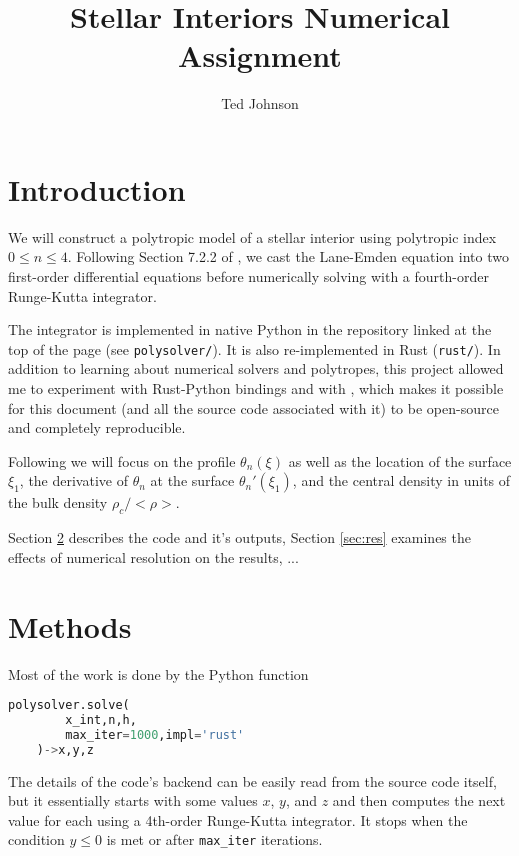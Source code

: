 \documentclass[twocolumn]{aastex631}
\begin{document}
\title{Stellar Interiors Numerical Assignment}

\author{Ted Johnson}


\section{Introduction}
\label{sec:intro}

We will construct a polytropic model of a stellar interior using
polytropic index $0\le n \le 4$. Following Section 7.2.2 of
\citet{textbook}, we cast the Lane-Emden equation into two
first-order differential equations before numerically solving
with a fourth-order Runge-Kutta integrator.

The integrator is implemented in native Python in the repository
linked at the top of the page (see \texttt{polysolver/}). It is
also re-implemented in Rust (\texttt{rust/}). In addition to
learning about numerical solvers and polytropes, this project
allowed me to experiment with Rust-Python bindings and with
\showyourwork \citep{Luger2021}, which makes it possible for
this document (and all the source code associated
with it) to be open-source and completely
reproducible.

Following \citet{textbook} we will focus on the profile $\theta_n(\xi)$
as well as the location of the surface $\xi_1$, the derivative
of $\theta_n$ at the surface $\theta_n'(\xi_1)$, and the central
density in units of the bulk density $\rho_c/<\rho>$.

Section \ref{sec:methods} describes the code and it's outputs,
Section \ref{sec:res} examines the effects of numerical resolution
on the results, ...


\section{Methods}
\label{sec:methods}
Most of the work is done by the Python function
\begin{lstlisting}[language=Python]
    polysolver.solve(
        x_int,n,h,
        max_iter=1000,impl='rust'
    )->x,y,z
\end{lstlisting}

The details of the code's backend can be easily read from
the source code itself, but it essentially starts with some
values $x$, $y$, and $z$ and then computes the next value for
each using a 4th-order Runge-Kutta integrator. It stops when
the condition $y \le 0$ is met or after \texttt{max\_iter} iterations.
\end{document}
